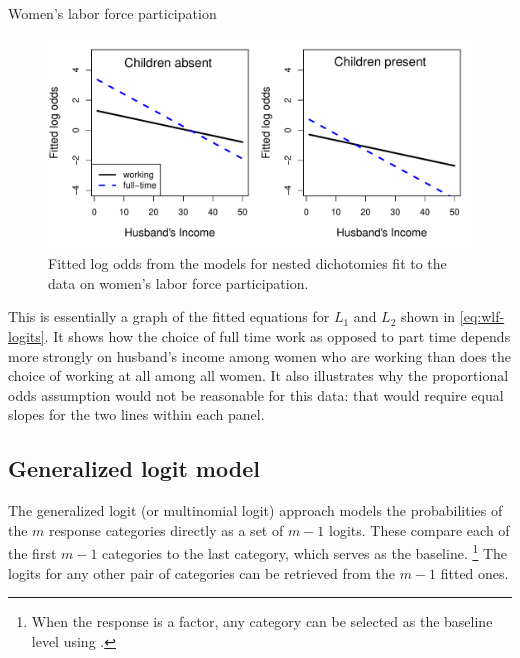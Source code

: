 \documentclass[11pt]{book}
\renewenvironment{knitrout}{\small\renewcommand{\baselinestretch}{.85}}{} %
\begin{document}
\begin{Example}[wlfpart1]{Women's labor force participation}
\begin{knitrout}
\begin{figure}[!htbp]
\centerline{\includegraphics[width=.9\textwidth]{ch07/fig/wlf-fitted-logit} }

\caption[Fitted log odds from the models for nested dichotomies fit to the data on women's labor force participation]{Fitted log odds from the models for nested dichotomies fit to the data on women's labor force participation.\label{fig:wlf-fitted-logit}}
\end{figure}


\end{knitrout}
This is essentially a
graph of the fitted equations for $L_1$ and $L_2$ shown in 
\eqref{eq:wlf-logits}.  It shows how the choice of full time
work as opposed to part time depends more strongly on husband's
income among women who are working than does the choice of
working at all among all women.  It also illustrates why the
proportional odds assumption would not be reasonable for this
data: that would require equal slopes for the two lines within
each panel.


\end{Example}

\subsection{Generalized logit model}\label{sec:genlogit}

The generalized logit (or multinomial logit)
approach 
models the probabilities of the $m$ response categories directly as a set of \(m - 1\) logits.  These compare
each of the first \(m - 1\) categories to the last category, which serves
as the baseline.%
\footnote{
When the response is a factor, any category can be selected as the
baseline level using .
}
The logits for any other pair of categories can be retrieved
from the \(m - 1\) fitted ones.
\end{document}
